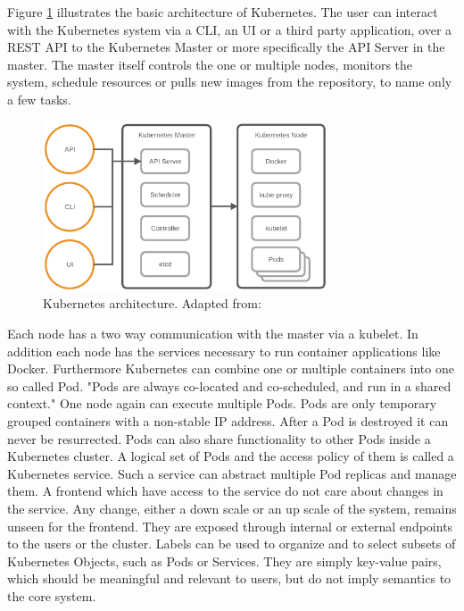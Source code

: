 Figure \ref{fig:kubernetes_architecture} illustrates the basic architecture of Kubernetes.
The user can interact with the Kubernetes system via a \ac{CLI}, an \ac{UI} or a third party application, over a \ac{REST} \ac{API} to the Kubernetes Master or more specifically the \ac{API} Server in the master.
The master itself controls the one or multiple nodes, monitors the system, schedule resources or pulls new images from the repository, to name only a few tasks.

\begin{figure}[H]
    \centering
    \includegraphics[width=0.75\textwidth]{resources/images/kubernetes_architecture.png}
    \caption[Kubernetes architecture]{Kubernetes architecture. Adapted from: \autocite[p. 4]{MSV:2016}}
    \label{fig:kubernetes_architecture}
\end{figure}

Each node has a two way communication with the master via a kubelet.
In addition each node has the services necessary to run container applications like Docker.
Furthermore Kubernetes can combine one or multiple containers into one so called Pod.\autocite[cf.][p. 7]{Mulyana:2016}
"Pods are always co-located and co-scheduled, and run in a shared context."\autocite{Kubernetes:pods:2016}
One node again can execute multiple Pods.
Pods are only temporary grouped containers with a non-stable \ac{IP} address.
After a Pod is destroyed it can never be resurrected.
Pods can also share functionality to other Pods inside a Kubernetes cluster.
A logical set of Pods and the access policy of them is called a Kubernetes service.
Such a service can abstract multiple Pod replicas and manage them.
A frontend which have access to the service do not care about changes in the service.
Any change, either a down scale or an up scale of the system, remains unseen for the frontend.
They are exposed through internal or external endpoints to the users or the cluster.\autocite[cf.][p. 11]{MSV:2016}
Labels can be used to organize and to select subsets of Kubernetes Objects, such as Pods or Services.\autocite[cf.]{Kubernetes:labels:2016}
They are simply key-value pairs, which should be meaningful and relevant to users, but do not imply semantics to the core system.\autocite[cf.]{Kubernetes:labels:2016}

